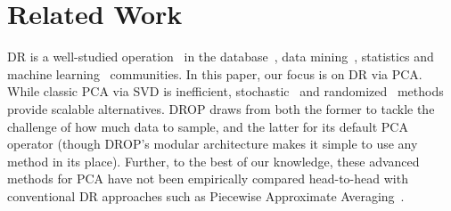 \section{Related Work}
\label{sec:relwork}
\label{sec:relatedwork}

 DR is a well-studied operation~\cite{dr-survey1,dr-survey2,nonlinear-dr} in the
database~\cite{keogh-indexing,local-dr,charu-ss}, data
mining~\cite{sax,paa}, statistics and machine
learning~\cite{alecton,shamir,bernstein} communities.
In this paper, our focus is on DR via PCA.
While classic PCA via SVD is inefficient, stochastic~\cite{re-new, shamir} and randomized~\cite{tropp} methods provide scalable alternatives.
DROP draws from both the former to tackle the challenge of how much data to sample, and the latter for its default PCA operator (though DROP's modular architecture makes it simple to use any method in its place). Further, to the best of our knowledge, these advanced methods for PCA have not been empirically compared head-to-head with conventional DR approaches such as Piecewise Approximate Averaging~\cite{paa}.






